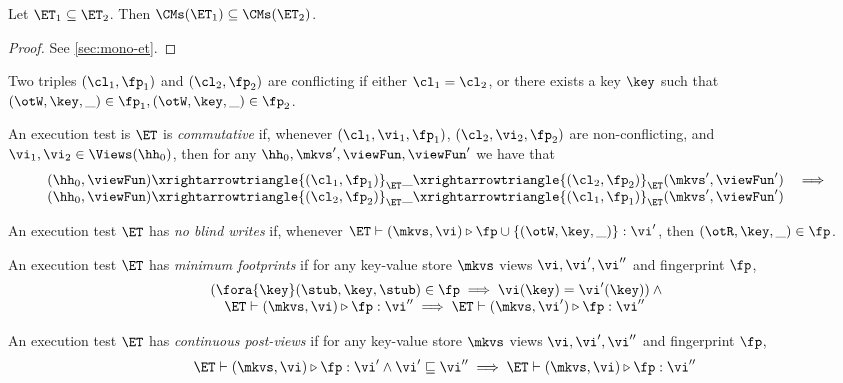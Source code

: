 \begin{proposition}
\label{prop:mono-et}
Let $\ET_1 \subseteq \ET_2$. Then $\CMs(\ET_1) \subseteq \CMs(\ET_2)$.
\end{proposition}
\begin{proof}
    \ifTechReport
    
    \else
    See \cref{sec:mono-et}.
    \fi
\end{proof}

\begin{definition}
Two triples $(\cl_1, \fp_1)$ and $(\cl_2, \fp_2)$ are 
conflicting if either $\cl_1 = \cl_2$, or there exists a key $\key$ such that 
$(\otW, \key, \_) \in \fp_1, (\otW, \key, \_) \in \fp_2$. 

An execution test is $\ET$ is \emph{commutative} if, whenever $(\cl_1, \vi_1, \fp_1)$, 
$(\cl_2, \vi_2, \fp_2)$ are non-conflicting, and $\vi_1, \vi_2 \in \Views(\hh_0)$,  
then for any $\hh_0, \mkvs', \viewFun, \viewFun'$ we have that 
\[
\begin{array}{lr}
(\hh_0, \viewFun) \xrightarrowtriangle{(\cl_1, \fp_1)}_{\ET} 
\_ \xrightarrowtriangle{(\cl_2, \fp_2)}_{\ET} (\mkvs', \viewFun') &\implies \\
(\hh_0, \viewFun) \xrightarrowtriangle{(\cl_2, \fp_2)}_{\ET} 
\_ \xrightarrowtriangle{(\cl_1, \fp_1)}_{\ET} (\mkvs', \viewFun')
\end{array}
\]
\end{definition}

\begin{definition}
An execution test $\ET$ has \emph{no blind writes} if, whenever $\ET \vdash (\mkvs, \vi) \triangleright \fp \cup \{(\otW, \key, \_)\} : \vi'$, 
then $(\otR, \key, \_) \in \fp$.
\end{definition}

\begin{definition}
An execution test $\ET$ has \emph{minimum footprints} if for any key-value store \( \mkvs \)
views \( \vi, \vi',\vi''\) and fingerprint \( \fp \),
\[
\begin{array}{@{}l@{}}
    ( \fora{ \key} (\stub, \key, \stub) \in \fp \implies \vi(\key) = \vi'(\key) ) \land {} \\
    \quad \ET \vdash (\mkvs, \vi) \triangleright \fp : \vi'' \implies \ET \vdash (\mkvs, \vi') \triangleright \fp : \vi''
\end{array}
\]
\end{definition}

\begin{definition}
An execution test $\ET$ has \emph{continuous post-views} if for any key-value store \( \mkvs \)
views \( \vi, \vi',\vi''\) and fingerprint \( \fp \), 
\[
\begin{array}{@{}l@{}}
    \quad \ET \vdash (\mkvs, \vi) \triangleright \fp : \vi' \land \vi' \sqsubseteq \vi'' \implies \ET \vdash (\mkvs, \vi) \triangleright \fp : \vi''
\end{array}
\]
\end{definition}

